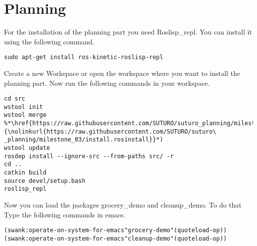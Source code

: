 \documentclass[main.tex]{subfiles}
\begin{document}
	\section{Planning}
	
	For the installation of the planning part you need Roslisp\_repl.
	You can install it using the following command.
	\begin{lstlisting}
sudo apt-get install ros-kinetic-roslisp-repl 
\end{lstlisting}

	Create a new Workspace or open the workspace where you want to install the planning part. Now run the following commands in your workspace.
	\begin{lstlisting}
cd src
wstool init
wstool merge %*\href{https://raw.githubusercontent.com/SUTURO/suturo_planning/milestone_03/install.rosinstall}{\nolinkurl{https://raw.githubusercontent.com/SUTURO/suturo\ _planning/milestone_03/install.rosinstall}}*)
wstool update
rosdep install --ignore-src --from-paths src/ -r
cd ..
catkin build
source devel/setup.bash
roslisp_repl
\end{lstlisting}
	
	Now you can load the packages grocery\_demo and cleanup\_demo.
	To do that Type the following commands in emacs.
	\begin{lstlisting}
(swank:operate-on-system-for-emacs"grocery-demo"(quoteload-op))
(swank:operate-on-system-for-emacs"cleanup-demo"(quoteload-op)) 
\end{lstlisting}
	
\end{document}
